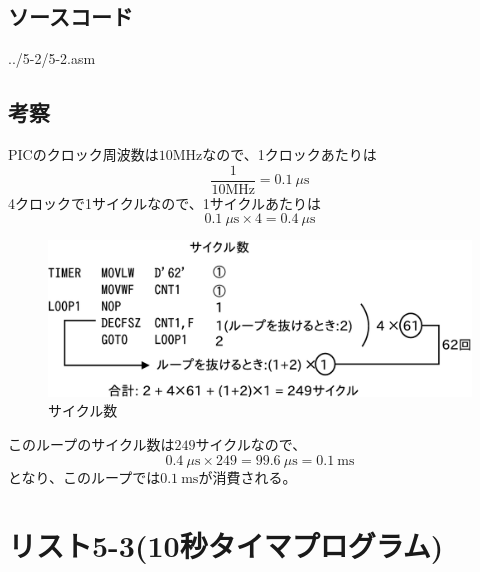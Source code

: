 \documentclass[a4paper,12pt]{ujarticle}
\begin{document}
  \subsection{ソースコード}
    \begin{lstinputlisting}[basicstyle=\ttfamily\footnotesize, frame=single]
     {../5-2/5-2.asm}
    \end{lstinputlisting}
    \subsection{考察}
    PICのクロック周波数は$10\si{\mega\hertz}$なので、1クロックあたりは
    \[
     \frac{1}{10\si{\mega\hertz}} = \SI{0.1}{\mu\second}
    \]
    4クロックで1サイクルなので、1サイクルあたりは
    \[
     \SI{0.1}{\mu\second} \times 4 = \SI{0.4}{\mu\second}
    \]
    \begin{figure}[htbp]
     \begin{center}
      \includegraphics[width=130mm]{Diagram5-2-1.eps}
     \end{center}
     \caption{サイクル数}
     \label{fig}
    \end{figure}

    このループのサイクル数は$249$サイクルなので、
    \[
     \SI{0.4}{\mu\second} \times 249 = \SI{99.6}{\mu\second} =  \SI{0.1}{\milli\second}
    \]
    となり、このループでは$\SI{0.1}{\milli\second}$が消費される。
    \clearpage
 \section{リスト5-3(10秒タイマプログラム)}
\end{document}
